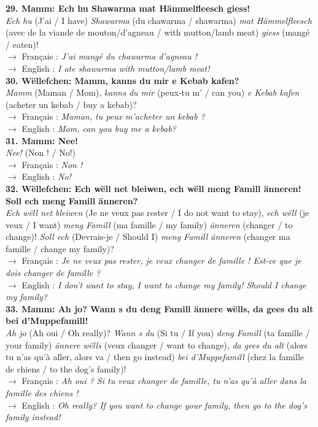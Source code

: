 \noindent\textbf{29. Mamm: Ech hu Shawarma mat Hämmelfleesch giess!}\\
\textit{Ech hu} (J'ai / I have) \textit{Shawarma} (du chawarma / shawarma) \textit{mat Hämmelfleesch} (avec de la viande de mouton/d'agneau / with mutton/lamb meat) \textit{giess} (mangé / eaten)!\\
$\rightarrow$ Français : \textit{J'ai mangé du chawarma d'agneau !}\\
$\rightarrow$ English : \textit{I ate shawarma with mutton/lamb meat!}\\[0.5em]

\noindent\textbf{30. Wëllefchen: Mamm, kanns du mir e Kebab kafen?}\\
\textit{Mamm} (Maman / Mom), \textit{kanns du mir} (peux-tu m' / can you) \textit{e Kebab kafen} (acheter un kebab / buy a kebab)?\\
$\rightarrow$ Français : \textit{Maman, tu peux m'acheter un kebab ?}\\
$\rightarrow$ English : \textit{Mom, can you buy me a kebab?}\\[0.5em]

\noindent\textbf{31. Mamm: Nee!}\\
\textit{Nee!} (Non ! / No!)\\
$\rightarrow$ Français : \textit{Non !}\\
$\rightarrow$ English : \textit{No!}\\[0.5em]

\noindent\textbf{32. Wëllefchen: Ech wëll net bleiwen, ech wëll meng Famill änneren! Soll ech meng Famill änneren?}\\
\textit{Ech wëll net bleiwen} (Je ne veux pas rester / I do not want to stay), \textit{ech wëll} (je veux / I want) \textit{meng Famill} (ma famille / my family) \textit{änneren} (changer / to change)! \textit{Soll ech} (Devrais-je / Should I) \textit{meng Famill änneren} (changer ma famille / change my family)?\\
$\rightarrow$ Français : \textit{Je ne veux pas rester, je veux changer de famille ! Est-ce que je dois changer de famille ?}\\
$\rightarrow$ English : \textit{I don't want to stay, I want to change my family! Should I change my family?}\\[0.5em]

\noindent\textbf{33. Mamm: Ah jo? Wann s du deng Famill ännere wëlls, da gees du alt bei d'Muppefamill!}\\
\textit{Ah jo} (Ah oui / Oh really)? \textit{Wann s du} (Si tu / If you) \textit{deng Famill} (ta famille / your family) \textit{ännere wëlls} (veux changer / want to change), \textit{da gees du alt} (alors tu n'as qu'à aller, alors va / then go instead) \textit{bei d'Muppefamill} (chez la famille de chiens / to the dog's family)!\\
$\rightarrow$ Français : \textit{Ah oui ? Si tu veux changer de famille, tu n'as qu'à aller dans la famille des chiens !}\\
$\rightarrow$ English : \textit{Oh really? If you want to change your family, then go to the dog's family instead!}\\[0.5em]

